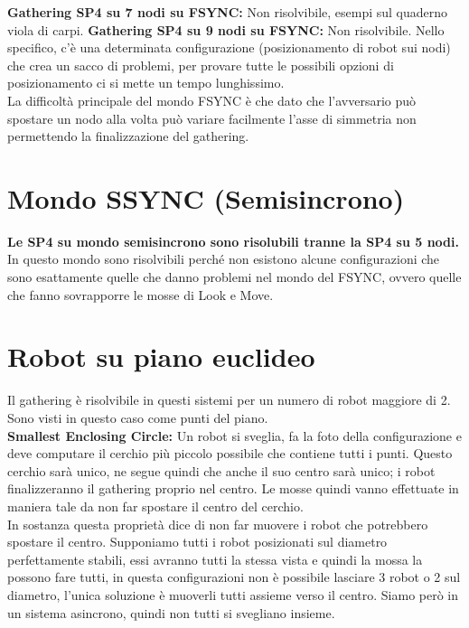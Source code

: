 \textbf{Gathering SP4 su 7 nodi su FSYNC:} Non risolvibile, esempi sul quaderno
viola di carpi. \textbf{Gathering SP4 su 9 nodi su FSYNC:} Non risolvibile.
Nello specifico, c'è una determinata configurazione (posizionamento di robot sui
nodi) che crea un sacco di problemi, per provare tutte le possibili opzioni di
posizionamento ci si mette un tempo lunghissimo.\\ La difficoltà principale del
mondo FSYNC è che dato che l'avversario può spostare un nodo alla volta può
variare facilmente l'asse di simmetria non permettendo la finalizzazione del
gathering.

\section{Mondo SSYNC (Semisincrono)}
\textbf{Le SP4 su mondo semisincrono sono risolubili tranne la SP4 su 5 nodi.}
In questo mondo sono risolvibili perché non esistono alcune configurazioni che
sono esattamente quelle che danno problemi nel mondo del FSYNC, ovvero quelle
che fanno sovrapporre le mosse di Look e Move.

\section{Robot su piano euclideo}
Il gathering è risolvibile in questi sistemi per un numero di robot maggiore di
2. Sono visti in questo caso come punti del piano.\\

\textbf{Smallest Enclosing
    Circle:} Un robot si sveglia, fa la foto della configurazione e deve computare
il cerchio più piccolo possibile che contiene tutti i punti. Questo cerchio sarà
unico, ne segue quindi che anche il suo centro sarà unico; i robot
finalizzeranno il gathering proprio nel centro. Le mosse quindi vanno effettuate
in maniera tale da non far spostare il centro del cerchio.\\

In sostanza questa proprietà dice di non far muovere i robot che potrebbero
spostare il centro. Supponiamo tutti i robot posizionati sul diametro
perfettamente stabili, essi avranno tutti la stessa vista e quindi la mossa la
possono fare tutti, in questa configurazioni non è possibile lasciare 3 robot o
2 sul diametro, l'unica soluzione è muoverli tutti assieme verso il centro.
Siamo però in un sistema asincrono, quindi non tutti si svegliano insieme.

